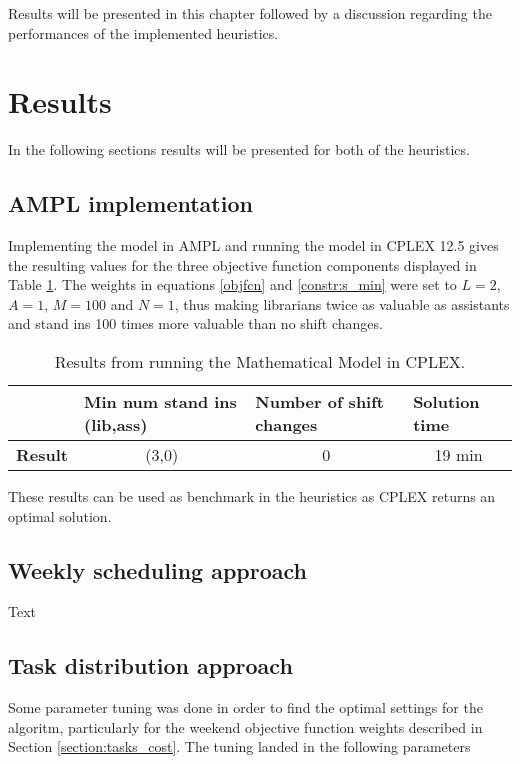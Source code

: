 Results will be presented in this chapter followed by a discussion regarding the performances of the implemented heuristics. 

\section{Results}
In the following sections results will be presented for both of the heuristics.

\subsection{AMPL implementation}

Implementing the model in AMPL and running the model in CPLEX 12.5 gives the resulting values for the three objective function components displayed in Table \ref{tab:CPLEX_res}. The weights in equations \ref{objfcn} and \ref{constr:s_min} were set to $L = 2$, $A = 1$, $M =100$ and $N=1$, thus making librarians twice as valuable as assistants and stand ins 100 times more valuable than no shift changes. 

\begin{table}[!h]
\centering
\label{tab:CPLEX_res}
\caption{Results from running the Mathematical Model in CPLEX.}
\begin{tabular}{|l|p{3cm}|p{3cm}|l|}
\hline
\rowcolor{Gray} & \textbf{Min num stand ins (lib,ass)} & \textbf{Number of shift changes} & \textbf{Solution time} \\ \hline
\cellcolor{Gray} \textbf{Result} & \multicolumn{1}{c|}{(3,0)} & \multicolumn{1}{c|}{0} & \multicolumn{1}{c|}{19 min} \\
\hline
\end{tabular}
\end{table}

These results can be used as benchmark in the heuristics as CPLEX returns an optimal solution. 

\subsection{Weekly scheduling approach}
Text

\subsection{Task distribution approach}

Some parameter tuning was done in order to find the optimal settings for the algoritm, particularly for the weekend objective function weights described in Section \ref{section:tasks_cost}. The tuning landed in the following parameters
 
